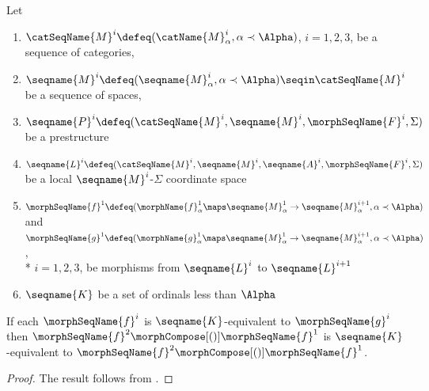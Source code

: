 \documentclass{article}
\begin{document}
\begin{lemma}
\label{lem:LCSmorphcompKequiv}
Let
\begin{enumerate}
\item
$\catSeqName{M}^i \defeq (\catName{M}^i_\alpha, \alpha \prec \Alpha)$,
$i=1,2,3$, be a sequence of categories,
\item
$
  \seqname{M}^i \defeq (\seqname{M}^i_\alpha, \alpha \prec \Alpha)
  \seqin \catSeqName{M}^i
$
be a sequence of spaces,
\item
$
  \seqname{P}^i \defeq
  (
    \catSeqName{M}^i,
    \seqname{M}^i,
    \morphSeqName{F}^i,
    \Sigma
  )
$
be a prestructure
\item
$
  \seqname{L}^i \defeq
  (
    \catSeqName{M}^i,
    \seqname{M}^i,
    \seqname{A}^i,
    \morphSeqName{F}^i,
    \Sigma
  )
$
be a local $\seqname{M}^i$-$\Sigma$ coordinate space
\item
$
  \morphSeqName{f}^1 \defeq
    (
      \morphName{f}^1_\alpha \maps
        \seqname{M}^1_\alpha \to \seqname{M}^{i+1}_\alpha,
      \alpha \prec \Alpha
    )
$
and
$
  \morphSeqName{g}^1 \defeq
    (
      \morphName{g}^1_\alpha \maps
        \seqname{M}^1_\alpha \to \seqname{M}^{i+1}_\alpha,
      \alpha \prec \Alpha
    )
$, \\*
$i=1,2,3$,
be morphisms from $\seqname{L}^i$ to $\seqname{L}^{i+1}$
\item
$\seqname{K}$ be a set of ordinals less than $\Alpha$
\end{enumerate}

If each $\morphSeqName{f}^i$ is $\seqname{K}$-equivalent to
$\morphSeqName{g}^i$ then
$\morphSeqName{f}^2 \morphCompose[()] \morphSeqName{f}^1$ is
$\seqname{K}$-equivalent to
$\morphSeqName{f}^2 \morphCompose[()] \morphSeqName{f}^1$.

\begin{proof}
The result follows from .
\end{proof}
\end{lemma}
\end{document}
